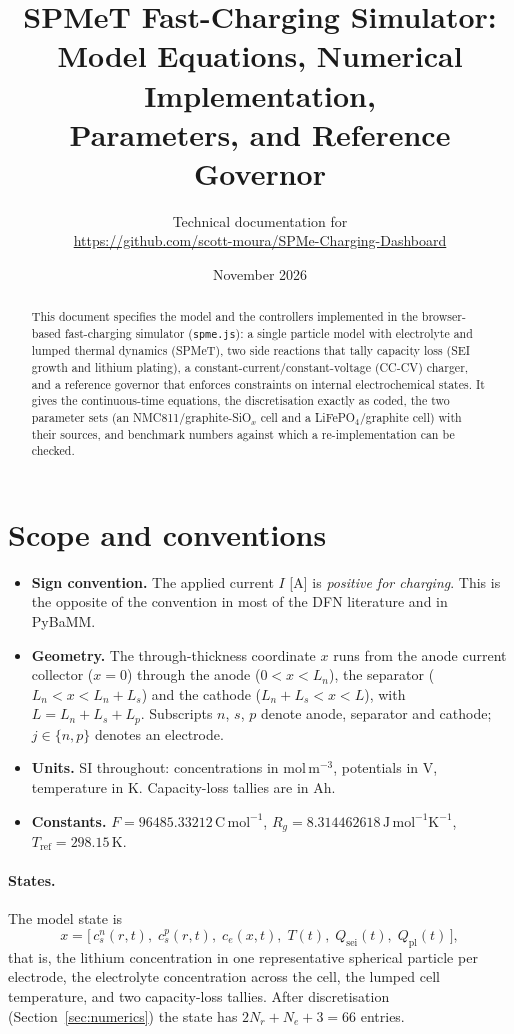 \documentclass[11pt]{article}
\title{SPMeT Fast-Charging Simulator:\\ Model Equations, Numerical Implementation,\\ Parameters, and Reference Governor}
\author{Technical documentation for\\ \url{https://github.com/scott-moura/SPMe-Charging-Dashboard}}
\date{November 2026}
\newcommand{\cs}{c_{s}}
\newcommand{\ce}{c_{e}}
\newcommand{\Tref}{T_{\mathrm{ref}}}
\newcommand{\code}[1]{\texttt{#1}}
\newcommand{\unit}[1]{\,\mathrm{#1}}
\begin{document}
\maketitle

\begin{abstract}
\noindent This document specifies the model and the controllers implemented in the browser-based fast-charging simulator (\code{spme.js}): a single particle model with electrolyte and lumped thermal dynamics (SPMeT), two side reactions that tally capacity loss (SEI growth and lithium plating), a constant-current/constant-voltage (CC-CV) charger, and a reference governor that enforces constraints on internal electrochemical states. It gives the continuous-time equations, the discretisation exactly as coded, the two parameter sets (an NMC811/graphite-SiO$_x$ cell and a LiFePO$_4$/graphite cell) with their sources, and benchmark numbers against which a re-implementation can be checked.
\end{abstract}

\tableofcontents

\section{Scope and conventions}

\begin{itemize}[leftmargin=*]
\item \textbf{Sign convention.} The applied current $I$ [A] is \emph{positive for charging}. This is the opposite of the convention in most of the DFN literature and in PyBaMM.
\item \textbf{Geometry.} The through-thickness coordinate $x$ runs from the anode current collector ($x=0$) through the anode ($0<x<L_n$), the separator ($L_n<x<L_n+L_s$) and the cathode ($L_n+L_s<x<L$), with $L=L_n+L_s+L_p$. Subscripts $n$, $s$, $p$ denote anode, separator and cathode; $j\in\{n,p\}$ denotes an electrode.
\item \textbf{Units.} SI throughout: concentrations in mol\,m$^{-3}$, potentials in V, temperature in K. Capacity-loss tallies are in Ah.
\item \textbf{Constants.} $F=96485.33212\unit{C\,mol^{-1}}$, $R_g=8.314462618\unit{J\,mol^{-1}K^{-1}}$, $\Tref=298.15\unit{K}$.
\end{itemize}

\paragraph{States.} The model state is
\begin{equation}
x=\bigl[\,\cs^{n}(r,t),\;\cs^{p}(r,t),\;\ce(x,t),\;T(t),\;Q_{\mathrm{sei}}(t),\;Q_{\mathrm{pl}}(t)\,\bigr],
\end{equation}
that is, the lithium concentration in one representative spherical particle per electrode, the electrolyte concentration across the cell, the lumped cell temperature, and two capacity-loss tallies. After discretisation (Section~\ref{sec:numerics}) the state has $2N_r+N_e+3=66$ entries.
\end{document}
